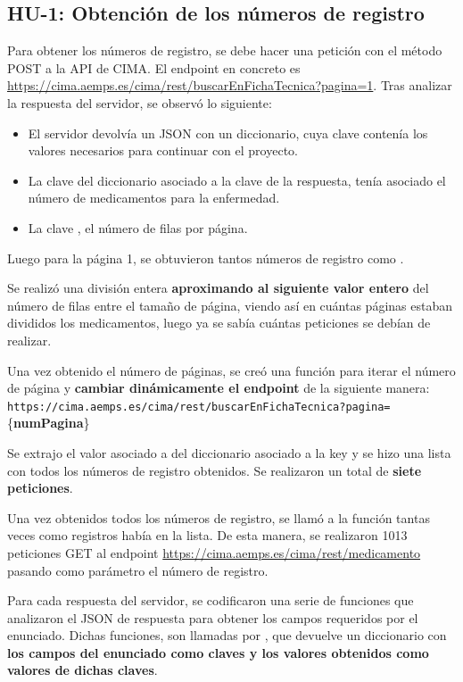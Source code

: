 \documentclass[11pt,a4paper]{article}
\begin{document}
\subsection{HU-1: Obtención de los números de registro}
Para obtener los números de registro, se debe hacer una petición con el método POST a la API
de CIMA. El endpoint en concreto es
\url{https://cima.aemps.es/cima/rest/buscarEnFichaTecnica?pagina=1}. Tras analizar la respuesta
del servidor, se observó lo siguiente:
\begin{itemize}
  \item El servidor devolvía un JSON con un diccionario, cuya clave  contenía los
        valores necesarios para continuar con el proyecto.
  \item La clave  del diccionario asociado a la clave  de la respuesta,
        tenía asociado el número de medicamentos para la enfermedad.
  \item La clave , el número de filas por página.
\end{itemize}

Luego para la página 1, se obtuvieron tantos números de registro como .

Se realizó una división entera \textbf{aproximando al siguiente valor entero} del número de filas
entre el tamaño de página, viendo así en cuántas páginas estaban divididos los medicamentos,
luego ya se sabía cuántas peticiones se debían de realizar.

Una vez obtenido el número de páginas, se creó una función para iterar el número de página y
\textbf{cambiar dinámicamente el endpoint} de la siguiente manera:
\nolinkurl{https://cima.aemps.es/cima/rest/buscarEnFichaTecnica?pagina=}\{\textbf{numPagina}\}

Se extrajo el valor asociado a  del diccionario asociado a la key  y se
hizo una lista con todos los números de registro obtenidos. Se realizaron un total de \textbf{siete
peticiones}.

Una vez obtenidos todos los números de registro, se llamó a la función
 tantas veces como registros había en la lista. De esta manera, se
realizaron 1013 peticiones GET al endpoint \url{https://cima.aemps.es/cima/rest/medicamento}
pasando como parámetro el número de registro.

Para cada respuesta del servidor, se codificaron una serie de funciones que analizaron el
JSON de respuesta para obtener los campos requeridos por el enunciado. Dichas funciones,
son llamadas por , que devuelve un diccionario con \textbf{los campos del
enunciado como claves y los valores obtenidos como valores de dichas claves}.
\end{document}
